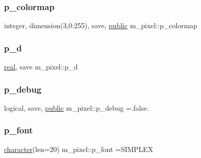 \mbox{\label{namespacem__pixel_aa6b9c445365db696d6a7a9a794ceba43}} 
\subsubsection{\texorpdfstring{p\+\_\+colormap}{p\_colormap}}
{\footnotesize\ttfamily integer, dimension(3,0\+:255), save, \hyperlink{M__stopwatch_83_8txt_a2f74811300c361e53b430611a7d1769f}{public} m\+\_\+pixel\+::p\+\_\+colormap}

\mbox{\label{namespacem__pixel_aedcfb264a04a70d3dba9dc7c347bdf37}} 
\subsubsection{\texorpdfstring{p\+\_\+d}{p\_d}}
{\footnotesize\ttfamily \hyperlink{read__watch_83_8txt_abdb62bde002f38ef75f810d3a905a823}{real}, save m\+\_\+pixel\+::p\+\_\+d\hspace{0.3cm}{\ttfamily [private]}}

\mbox{\label{namespacem__pixel_aa98d89b6e06aa65bb897ee27901ab8ce}} 
\subsubsection{\texorpdfstring{p\+\_\+debug}{p\_debug}}
{\footnotesize\ttfamily logical, save, \hyperlink{M__stopwatch_83_8txt_a2f74811300c361e53b430611a7d1769f}{public} m\+\_\+pixel\+::p\+\_\+debug =.false.}

\mbox{\label{namespacem__pixel_a06bbf83bc5125cad5aba0af267af0e18}} 
\subsubsection{\texorpdfstring{p\+\_\+font}{p\_font}}
{\footnotesize\ttfamily \hyperlink{option__stopwatch_83_8txt_abd4b21fbbd175834027b5224bfe97e66}{character}(len=20) m\+\_\+pixel\+::p\+\_\+font =\textquotesingle{}S\+I\+M\+P\+L\+EX\textquotesingle{}\hspace{0.3cm}{\ttfamily [private]}}

